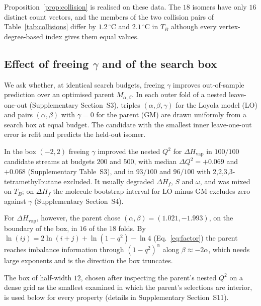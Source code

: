 \documentclass[a5paper, 10pt]{article}
\theoremstyle{plain}
\theoremstyle{remark}
\theoremstyle{definition}
\begin{document}
Proposition~\ref{prop:collision} is realised on these data. The $18$
isomers have only $16$ distinct count vectors, and the members of the
two collision pairs of Table~\ref{tab:collisions} differ by $1.2\,^{\circ}$C and $2.1\,^{\circ}$C in $T_B$ although every
vertex-degree-based index gives them equal values.

\subsection{Effect of freeing $\gamma$ and of the search
box}\label{sec:ablation}

We ask whether, at identical search budgets, freeing $\gamma$ improves
out-of-sample prediction over an optimised parent $M_{\alpha,\beta}$.
In each outer fold of a nested leave-one-out (Supplementary Section~S3),
triples $(\alpha,\beta,\gamma)$ for the Loyola model (LO) and pairs
$(\alpha,\beta)$ with $\gamma = 0$ for the parent (GM) are drawn uniformly
from a search box at equal budget. The candidate with the smallest
inner leave-one-out error is refit and predicts the held-out isomer.

In the box $(-2,2)$ freeing $\gamma$ improved the nested $Q^2$ for
$\Delta H_{\mathrm{vap}}$ in $100/100$ candidate streams at budgets
$200$ and $500$, with median $\Delta Q^2 = +0.069$ and $+0.068$
(Supplementary Table~S3), and in $93/100$ and $96/100$ with
2,2,3,3-tetramethylbutane excluded. It usually degraded $\Delta H_f$, $S$
and $\omega$, and was mixed on $T_B$; on $\Delta H_f$ the molecule-bootstrap
interval for LO minus GM excludes zero against $\gamma$
(Supplementary Section~S4).

For $\Delta H_{\mathrm{vap}}$, however, the parent
chose $(\alpha,\beta) = (1.021, -1.993)$, on the boundary of the box, in
$16$ of the $18$ folds. By $\ln(ij) = 2\ln(i+j) + \ln(1-q^2) - \ln 4$
(Eq.~\eqref{eq:factor}) the parent reaches imbalance information through
$(1-q^2)^{\alpha}$ along $\beta \approx -2\alpha$, which needs large
exponents and is the direction the box truncates.

The box of half-width $12$, chosen after inspecting the parent's nested $Q^2$ on a dense grid as the smallest examined in which the parent's selections are interior, is used below for every property (details in Supplementary Section~S11).
\end{document}
